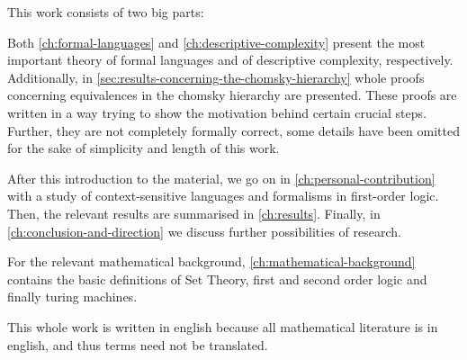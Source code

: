 This work consists of two big parts:

Both \cref{ch:formal-languages} and \cref{ch:descriptive-complexity} present the most important theory of formal languages and of descriptive complexity, respectively.
Additionally, in \cref{sec:results-concerning-the-chomsky-hierarchy} whole proofs concerning equivalences in the chomsky hierarchy are presented.
These proofs are written in a way trying to show the motivation behind certain crucial steps.
Further, they are not completely formally correct, some details have been omitted for the sake of simplicity and length of this work.

After this introduction to the material, we go on in \cref{ch:personal-contribution} with a study of context-sensitive languages and formalisms in first-order logic.
Then, the relevant results are summarised in \cref{ch:results}.
Finally, in \cref{ch:conclusion-and-direction} we discuss further possibilities of research.

For the relevant mathematical background, \cref{ch:mathematical-background} contains the basic definitions of Set Theory, first and second order logic and finally turing machines.

This whole work is written in english because all mathematical literature is in english, and thus terms need not be translated.